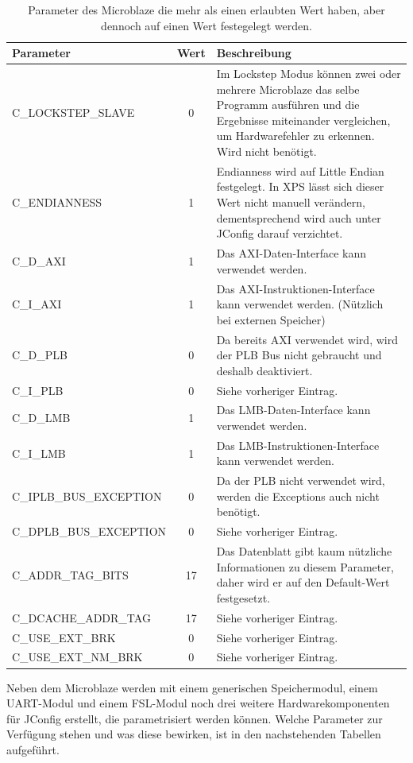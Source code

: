 \begin{table}[ht!]
	\begin{tabular}{|l|c|p{10cm}|}
		\hline \textbf{Parameter} & \textbf{Wert} & \textbf{Beschreibung} \\ 
		\hline C\_LOCKSTEP\_SLAVE & 0 & Im Lockstep Modus können zwei oder mehrere \newline Microblaze das selbe Programm ausführen und die Ergebnisse miteinander vergleichen, um Hardwarefehler zu erkennen. Wird nicht benötigt.\\ 
		\hline C\_ENDIANNESS & 1 & Endianness wird auf Little Endian festgelegt. In XPS lässt sich dieser Wert nicht manuell verändern, dementsprechend wird auch unter JConfig darauf verzichtet.\\ 
		\hline C\_D\_AXI & 1 & Das AXI-Daten-Interface kann verwendet werden. \\ 
		\hline C\_I\_AXI & 1 & Das AXI-Instruktionen-Interface kann verwendet werden. (Nützlich bei externen Speicher) \\ 
		\hline C\_D\_PLB & 0 & Da bereits AXI verwendet wird, wird der PLB Bus nicht gebraucht und deshalb deaktiviert. \\ 
		\hline C\_I\_PLB & 0 & Siehe vorheriger Eintrag. \\ 
		\hline C\_D\_LMB & 1 & Das LMB-Daten-Interface kann verwendet werden. \\ 
		\hline C\_I\_LMB & 1 & Das LMB-Instruktionen-Interface kann verwendet werden. \\ 
		\hline C\_IPLB\_BUS\_EXCEPTION & 0 & Da der PLB nicht verwendet wird, werden die Exceptions auch nicht benötigt. \\ 
		\hline C\_DPLB\_BUS\_EXCEPTION & 0 & Siehe vorheriger Eintrag. \\ 
		\hline C\_ADDR\_TAG\_BITS & 17 & Das Datenblatt gibt kaum nützliche Informationen zu diesem Parameter, daher wird er auf den Default-Wert festgesetzt. \\ 
		\hline C\_DCACHE\_ADDR\_TAG & 17 & Siehe vorheriger Eintrag. \\ 
		\hline C\_USE\_EXT\_BRK & 0 & Siehe vorheriger Eintrag. \\ 
		\hline C\_USE\_EXT\_NM\_BRK & 0 & Siehe vorheriger Eintrag. \\ 
		\hline 
	\end{tabular}
	\centering
	\caption{Parameter des Microblaze die mehr als einen erlaubten Wert haben, aber dennoch auf einen Wert festegelegt werden.}
	\label{tab:MicParam}
\end{table}
Neben dem Microblaze werden mit einem generischen Speichermodul, einem UART-Modul und einem FSL-Modul noch drei weitere Hardwarekomponenten für JConfig erstellt, die parametrisiert werden können. Welche Parameter zur Verfügung stehen und was diese bewirken, ist in den nachstehenden Tabellen aufgeführt.

